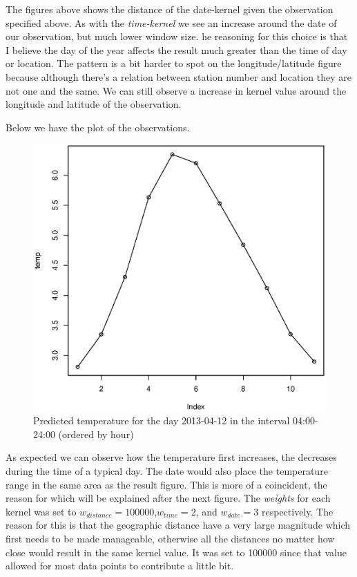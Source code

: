 \documentclass[a4paper, 12pt]{article}
\begin{document}
    The figures above shows the distance of the date-kernel given the observation specified above. As with the \textit{time-kernel} we see an increase around the date of our observation, but much lower window size. he reasoning for this choice is that I believe the day of the year affects the result much greater than the time of day or location.
    The pattern is a bit harder to spot on the longitude/latitude figure because although there's a relation between station number and location they are not one and the same. We can still observe a increase in kernel value around the longitude and latitude of the observation.

    Below we have the plot of the observations.
    \begin{figure}[H]
    \centering
    \caption{Predicted temperature for the day 2013-04-12 in the interval 04:00-24:00 (ordered by hour)\label{fig:result}}
        \begin{minipage}[]{0.4\textwidth}
            \includegraphics[width=\textwidth]{share/result.eps}
        \end{minipage}
    \end{figure}
    As expected we can observe how the temperature first increases, the decreases during the time of a typical day. The date would also place the temperature range in the same area as the result figure. This is more of a  coincident, the reason for which will be explained after the next figure. The \textit{weights} for each kernel was set to \(w_{distance} = 100000 \),\(w_{time} = 2 \), and \(w_{date} = 3\) respectively. The reason for this is that the geographic distance have a very large magnitude which first needs to be made manageable, otherwise all the distances no matter how close would result in the same kernel value. It was set to 100000 since that value allowed for most data points to contribute a little bit. 
\end{document}
